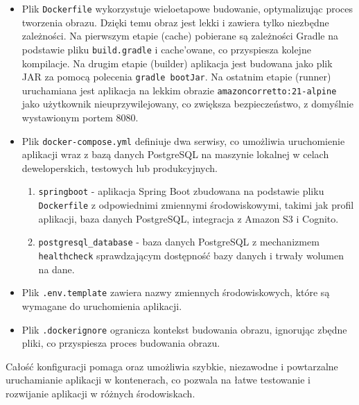 \documentclass[../../main.tex]{subfiles}
\begin{document}
    \begin{itemize}
        \item Plik \texttt{Dockerfile} wykorzystuje wieloetapowe budowanie, optymalizując proces tworzenia obrazu. Dzięki temu obraz jest lekki i zawiera tylko niezbędne zależności.
        Na pierwszym etapie (cache) pobierane są zależności Gradle na podstawie pliku \texttt{build.gradle} i cache’owane, co przyspiesza kolejne kompilacje.
        Na drugim etapie (builder) aplikacja jest budowana jako plik JAR za pomocą polecenia \texttt{gradle bootJar}.
        Na ostatnim etapie (runner) uruchamiana jest aplikacja na lekkim obrazie \texttt{amazoncorretto:21-alpine} jako użytkownik nieuprzywilejowany, co zwiększa bezpieczeństwo, z domyślnie wystawionym portem 8080.
        \item Plik \texttt{docker-compose.yml} definiuje dwa serwisy, co umożliwia uruchomienie aplikacji wraz z bazą danych PostgreSQL na maszynie lokalnej w celach deweloperskich, testowych lub produkcyjnych.
        \begin{enumerate}
            \item \texttt{springboot} - aplikacja Spring Boot zbudowana na podstawie pliku \texttt{Dockerfile} z odpowiednimi zmiennymi środowiskowymi, takimi jak profil aplikacji, baza danych PostgreSQL, integracja z Amazon S3 i Cognito.
            \item \texttt{postgresql\_database} - baza danych PostgreSQL z mechanizmem \texttt{healthcheck} sprawdzającym dostępność bazy danych i trwały wolumen na dane.
        \end{enumerate}
        \item Plik \texttt{.env.template} zawiera nazwy zmiennych środowiskowych, które są wymagane do uruchomienia aplikacji.
        \item Plik \texttt{.dockerignore} ogranicza kontekst budowania obrazu, ignorując zbędne pliki, co przyspiesza proces budowania obrazu.
    \end{itemize}
    Całość konfiguracji pomaga oraz umożliwia szybkie, niezawodne i powtarzalne uruchamianie aplikacji w kontenerach, co pozwala na łatwe testowanie i rozwijanie aplikacji w różnych środowiskach.
\end{document}
